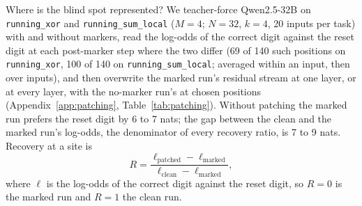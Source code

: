 \documentclass[10pt]{article} %
\newcommand{\task}[1]{\texttt{#1}}
\begin{document}
Where is the blind spot represented? We teacher-force Qwen2.5-32B on \task{running\_xor} and \task{running\_sum\_local} ($M = 4$; $N = 32$, $k = 4$, 20 inputs per task) with and without markers, read the log-odds of the correct digit against the reset digit at each post-marker step where the two differ (69 of 140 such positions on \task{running\_xor}, 100 of 140 on \task{running\_sum\_local}; averaged within an input, then over inputs), and then overwrite the marked run's residual stream at one layer, or at every layer, with the no-marker run's at chosen positions (Appendix~\ref{app:patching}, Table~\ref{tab:patching}). Without patching the marked run prefers the reset digit by 6 to 7 nats; the gap between the clean and the marked run's log-odds, the denominator of every recovery ratio, is 7 to 9 nats. Recovery at a site is
\begin{equation}
R = \frac{\ell_{\text{patched}} - \ell_{\text{marked}}}{\ell_{\text{clean}} - \ell_{\text{marked}}},
\label{eq:recovery}
\end{equation}
where $\ell$ is the log-odds of the correct digit against the reset digit, so $R = 0$ is the marked run and $R = 1$ the clean run.
\end{document}
